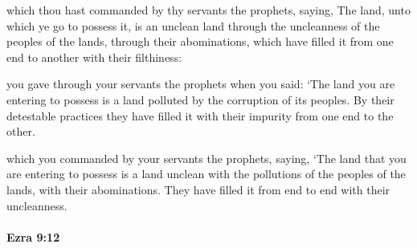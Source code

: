 			\begin{versebox}
					\item[BHS] 
					\item[LXX] 
					\item[ASV] which thou hast commanded by thy servants the prophets, saying, The land, unto which ye go to possess it, is an unclean land through the uncleanness of the peoples of the lands, through their abominations, which have filled it from one end to another with their filthiness:
					\item[NIV] you gave through your servants the prophets when you said: ‘The land you are entering to possess is a land polluted by the corruption of its peoples. By their detestable practices they have filled it with their impurity from one end to the other.
					\item[NRSV] which you commanded by your servants the prophets, saying, ‘The land that you are entering to possess is a land unclean with the pollutions of the peoples of the lands, with their abominations. They have filled it from end to end with their uncleanness.
			\end{versebox}

		\paragraph{Ezra 9:12} %
			\label{EZRA-9-12}

